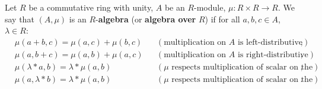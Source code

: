 \begin{definition}
  Let
    $R$ be a commutative ring with unity,
    $A$ be an $R$-module,
    $\mu \colon R \times R \to R$.
  We say that $(A, \mu)$ is an $R$-\textbf{algebra}
  (or \textbf{algebra over} $R$) if
  for all $a, b, c \in A$, $\lambda \in R$:
  \begin{subequations}
    \begin{alignat}{2}
      & \mu(a + b, c) = \mu(a, c) + \mu(b, c)
      && (\text{multiplication on $A$ is left-distributive}), \\
      & \mu(a, b + c) = \mu(a, b) + \mu(a, c)
      && (\text{multiplication on $A$ is right-distributive}), \\
      & \mu(\lambda * a, b) = \lambda * \mu(a, b)\qquad
      && (\text{$\mu$ respects multiplication of scalar on the left}), \\
      & \mu(a, \lambda * b) = \lambda * \mu(a, b)\qquad
      && (\text{$\mu$ respects multiplication of scalar on the right}).
    \end{alignat}
  \end{subequations}
\end{definition}
